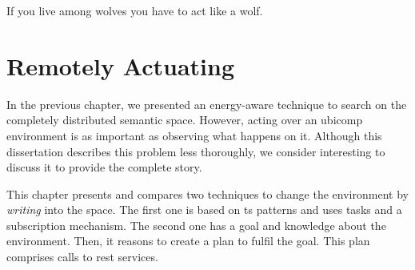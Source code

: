 
\begin{savequote}[50mm]
If you live among wolves you have to act like a wolf.
\end{savequote}


\chapter{Remotely Actuating}
\label{cha:actuate}


\newcommand{\restdesc}{\emph{RESTdesc}}



\ifpdf
    \graphicspath{{\pathchapsix/figures/PNG/}{\pathchapsix/figures/PDF/}{\pathchapsix/figures/JPG/}{\pathchapsix/figures/}}
\else
    \graphicspath{{\pathchapsix/figures/EPS/}{\pathchapsix/figures/}}
\fi



In the previous chapter, we presented an energy-aware technique to search on the completely distributed semantic space.
However, acting over an \ac{ubicomp} environment is as important as observing what happens on it. %
Although this dissertation describes this problem less thoroughly, we consider interesting to discuss it to provide the complete story. %

This chapter presents and compares two techniques to change the environment by \emph{writing} into the space. %
The first one is based on \ac{ts} patterns and uses tasks and a subscription mechanism.
The second one has a goal and knowledge about the environment.
Then, it reasons to create a plan to fulfil the goal.
This plan comprises calls to \ac{rest} services.







